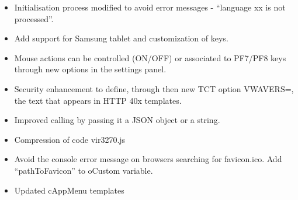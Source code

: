 \documentclass[letterpaper,10pt,english]{sphinxmanual}
\begin{document}
\begin{itemize}
\item {} 
Initialisation process modified to avoid error messages - “language xx is not processed”.

\end{itemize}

\begin{itemize}
\item {} 
Add support for Samsung tablet and customization of keys.

\end{itemize}

\begin{itemize}
\item {} 
Mouse actions can be controlled (ON/OFF) or associated to PF7/PF8 keys through new options in the settings panel.

\end{itemize}

\begin{itemize}
\item {} 
Security enhancement to define, through then new TCT option VWAVERS=, the text that appears in HTTP 40x templates.

\end{itemize}

\begin{itemize}
\item {} 
Improved calling by passing it a JSON object or a string.

\item {} 
Compression of code vir3270.js

\end{itemize}

\begin{itemize}
\item {} 
Avoid the console error message on browsers searching for favicon.ico. Add “pathToFavicon” to oCustom variable.

\end{itemize}

\begin{itemize}
\item {} 
Updated cAppMenu templates

\end{itemize}
\end{document}
